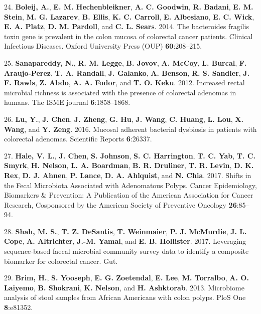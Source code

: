 \documentclass[12pt,]{article}
\begin{document}
\hypertarget{ref-bfrag_Boleij_2014}{}
24. \textbf{Boleij, A.}, \textbf{E. M. Hechenbleikner}, \textbf{A. C.
Goodwin}, \textbf{R. Badani}, \textbf{E. M. Stein}, \textbf{M. G.
Lazarev}, \textbf{B. Ellis}, \textbf{K. C. Carroll}, \textbf{E.
Albesiano}, \textbf{E. C. Wick}, \textbf{E. A. Platz}, \textbf{D. M.
Pardoll}, and \textbf{C. L. Sears}. 2014. The bacteroides fragilis toxin
gene is prevalent in the colon mucosa of colorectal cancer patients.
Clinical Infectious Diseases. Oxford University Press (OUP)
\textbf{60}:208--215.

\hypertarget{ref-sanapareddy_increased_2012}{}
25. \textbf{Sanapareddy, N.}, \textbf{R. M. Legge}, \textbf{B. Jovov},
\textbf{A. McCoy}, \textbf{L. Burcal}, \textbf{F. Araujo-Perez},
\textbf{T. A. Randall}, \textbf{J. Galanko}, \textbf{A. Benson},
\textbf{R. S. Sandler}, \textbf{J. F. Rawls}, \textbf{Z. Abdo},
\textbf{A. A. Fodor}, and \textbf{T. O. Keku}. 2012. Increased rectal
microbial richness is associated with the presence of colorectal
adenomas in humans. The ISME journal \textbf{6}:1858--1868.

\hypertarget{ref-lu_mucosal_2016}{}
26. \textbf{Lu, Y.}, \textbf{J. Chen}, \textbf{J. Zheng}, \textbf{G.
Hu}, \textbf{J. Wang}, \textbf{C. Huang}, \textbf{L. Lou}, \textbf{X.
Wang}, and \textbf{Y. Zeng}. 2016. Mucosal adherent bacterial dysbiosis
in patients with colorectal adenomas. Scientific Reports
\textbf{6}:26337.

\hypertarget{ref-hale_shifts_2017}{}
27. \textbf{Hale, V. L.}, \textbf{J. Chen}, \textbf{S. Johnson},
\textbf{S. C. Harrington}, \textbf{T. C. Yab}, \textbf{T. C. Smyrk},
\textbf{H. Nelson}, \textbf{L. A. Boardman}, \textbf{B. R. Druliner},
\textbf{T. R. Levin}, \textbf{D. K. Rex}, \textbf{D. J. Ahnen},
\textbf{P. Lance}, \textbf{D. A. Ahlquist}, and \textbf{N. Chia}. 2017.
Shifts in the Fecal Microbiota Associated with Adenomatous Polyps.
Cancer Epidemiology, Biomarkers \& Prevention: A Publication of the
American Association for Cancer Research, Cosponsored by the American
Society of Preventive Oncology \textbf{26}:85--94.

\hypertarget{ref-shah_leveraging_2017}{}
28. \textbf{Shah, M. S.}, \textbf{T. Z. DeSantis}, \textbf{T.
Weinmaier}, \textbf{P. J. McMurdie}, \textbf{J. L. Cope}, \textbf{A.
Altrichter}, \textbf{J.-M. Yamal}, and \textbf{E. B. Hollister}. 2017.
Leveraging sequence-based faecal microbial community survey data to
identify a composite biomarker for colorectal cancer. Gut.

\hypertarget{ref-brim_microbiome_2013}{}
29. \textbf{Brim, H.}, \textbf{S. Yooseph}, \textbf{E. G. Zoetendal},
\textbf{E. Lee}, \textbf{M. Torralbo}, \textbf{A. O. Laiyemo},
\textbf{B. Shokrani}, \textbf{K. Nelson}, and \textbf{H. Ashktorab}.
2013. Microbiome analysis of stool samples from African Americans with
colon polyps. PloS One \textbf{8}:e81352.
\end{document}
